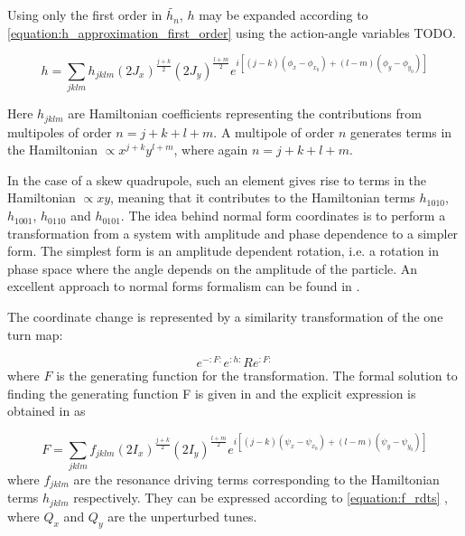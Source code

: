 Using only the first order in \(\tilde{h_{n}}\), \(h\) may be expanded according to \cref{equation:h_approximation_first_order} using the action-angle variables TODO.

\begin{equation}
    h = \sum_{j k l m} h_{j k l m} \left(2 J_{x}\right)^{\frac{j+k}{2}} \left(2 J_{y}\right)^{\frac{l+m}{2}} e^{i \left[(j-k)\left(\phi_{x}-\phi_{x_{0}}\right) + (l-m)\left(\phi_{y}-\phi_{y_{0}}\right) \right]}
    \label{equation:h_approximation_first_order}
\end{equation}

Here \(h_{j k l m}\) are Hamiltonian coefficients representing the contributions from multipoles of order \(n = j + k + l + m\).
A multipole of order \(n\) generates terms in the Hamiltonian \(\propto x^{j+k} y^{l+m}\), where again \(n = j + k + l + m\).

In the case of a skew quadrupole, such an element gives rise to terms in the Hamiltonian \(\propto xy\), meaning that it contributes to the Hamiltonian terms \(h_{1010}\), \(h_{1001}\), \(h_{0110}\) and \(h_{0101}\).
The idea behind normal form coordinates is to perform a transformation from a system with amplitude and phase dependence to a simpler form.
The simplest form is an amplitude dependent rotation, i.e. a rotation in phase space where the angle depends on the amplitude of the particle.
An excellent approach to normal forms formalism can be found in \cite{Carlier_thesis}.

The coordinate change is represented by a similarity transformation of the one turn map:

\begin{equation}
    e^{-: F:} e^{: h:} R e^{: F:}
\end{equation}
where \(F\) is the generating function for the transformation.
The formal solution to finding the generating function F is given in \cite{Forest_normal_forms} and the explicit expression is obtained in \cite{Tomas_thesis} as

\begin{equation}
    F = \sum_{j k l m} f_{j k l m} \left(2 I_{x}\right)^{\frac{j+k}{2}}\left(2 I_{y}\right)^{\frac{l+m}{2}} e^{i\left[(j-k)\left(\psi_{x}-\psi_{x_{0}}\right)+(l-m)\left(\psi_{y}-\psi_{y_{0}}\right)\right]}
    \label{equation:F_generating}
\end{equation}
where \(f_{jklm}\) are the resonance driving terms corresponding to the Hamiltonian terms \(h_{jklm}\) respectively.
They can be expressed according to \cref{equation:f_rdts} \cite{Tomas_thesis, Franchi_thesis}, where \(Q_x\) and \(Q_y\) are the unperturbed tunes.

